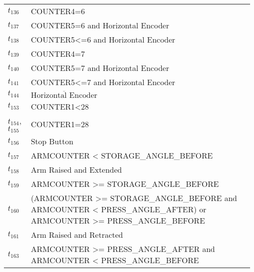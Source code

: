 \begin{longtable}{M{5cm}M{10cm}}
\hyperlink{completeNet:t136}{\hypertarget{completeTable:t136}{$t_{136}$}} & COUNTER4=6\\
\hyperlink{completeNet:t137}{\hypertarget{completeTable:t137}{$t_{137}$}} & COUNTER5=6 and Horizontal Encoder\\
\hyperlink{completeNet:t138}{\hypertarget{completeTable:t138}{$t_{138}$}} & COUNTER5<=6 and Horizontal Encoder\\
\hyperlink{completeNet:t139}{\hypertarget{completeTable:t139}{$t_{139}$}} & COUNTER4=7\\
\hyperlink{completeNet:t140}{\hypertarget{completeTable:t140}{$t_{140}$}} & COUNTER5=7 and Horizontal Encoder\\
\hyperlink{completeNet:t141}{\hypertarget{completeTable:t141}{$t_{141}$}} & COUNTER5<=7 and Horizontal Encoder\\
\hyperlink{completeNet:t144}{\hypertarget{completeTable:t144}{$t_{144}$}} & \(\overline{\mbox{Horizontal Encoder}}\)\\
\hyperlink{completeNet:t153}{\hypertarget{completeTable:t153}{$t_{153}$}} & COUNTER1<28\\
\hyperlink{completeNet:t154}{\hypertarget{completeTable:t154}{$t_{154}$}}, \hyperlink{completeNet:t155}{\hypertarget{completeTable:t155}{$t_{155}$}} & COUNTER1=28\\
\hyperlink{completeNet:t156}{\hypertarget{completeTable:t156}{$t_{156}$}} & Stop Button\\
\hyperlink{completeNet:t157}{\hypertarget{completeTable:t157}{$t_{157}$}} & ARMCOUNTER < {\footnotesize STORAGE\_ANGLE\_BEFORE}\\
\hyperlink{completeNet:t158}{\hypertarget{completeTable:t158}{$t_{158}$}} & Arm Raised and Extended\\
\hyperlink{completeNet:t159}{\hypertarget{completeTable:t159}{$t_{159}$}} & ARMCOUNTER >= {\footnotesize STORAGE\_ANGLE\_BEFORE}\\
\hyperlink{completeNet:t160}{\hypertarget{completeTable:t160}{$t_{160}$}} & (ARMCOUNTER >= {\footnotesize STORAGE\_ANGLE\_BEFORE} and ARMCOUNTER < {\footnotesize PRESS\_ANGLE\_AFTER}) or ARMCOUNTER >= {\footnotesize PRESS\_ANGLE\_BEFORE}\\
\hyperlink{completeNet:t161}{\hypertarget{completeTable:t161}{$t_{161}$}} & Arm Raised and Retracted\\
\hyperlink{completeNet:t163}{\hypertarget{completeTable:t163}{$t_{163}$}} & ARMCOUNTER >= {\footnotesize PRESS\_ANGLE\_AFTER} and ARMCOUNTER < {\footnotesize PRESS\_ANGLE\_BEFORE}\\

\end{longtable}
